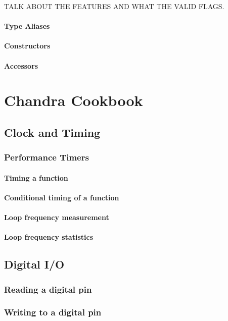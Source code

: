 \documentclass[10pt,letterpaper]{memoir} %
\begin{document}
TALK ABOUT THE FEATURES AND WHAT THE VALID FLAGS.

\subsection{Type Aliases}

\subsection{Constructors}

\subsection{Accessors}



\part{Chandra Cookbook}
\chapter{Clock and Timing}
\section{Performance Timers}
\subsection{Timing a function}
\subsection{Conditional timing of a function}
\subsection{Loop frequency measurement}
\subsection{Loop frequency statistics}

\chapter{Digital I/O}
\section{Reading a digital pin}
\section{Writing to a digital pin}
\end{document}
